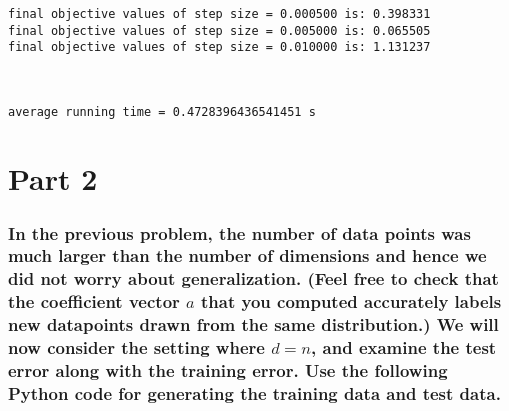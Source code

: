 \documentclass[11pt]{article}
\begin{document}
    \begin{Verbatim}[commandchars=\\\{\}]
final objective values of step size = 0.000500 is: 0.398331
final objective values of step size = 0.005000 is: 0.065505
final objective values of step size = 0.010000 is: 1.131237

    \end{Verbatim}

    \begin{center}
    \end{center}
    { \hspace*{\fill} \\}
    
    \begin{Verbatim}[commandchars=\\\{\}]
average running time = 0.4728396436541451 s

    \end{Verbatim}

    \section{Part 2}\label{part-2}

\subsubsection{\texorpdfstring{In the previous problem, the number of
data points was much larger than the number of dimensions and hence we
did not worry about generalization. (Feel free to check that the
coefficient vector \(a\) that you computed accurately labels new
datapoints drawn from the same distribution.) We will now consider the
setting where \(d = n\), and examine the test error along with the
training error. Use the following Python code for generating the
training data and test
data.}{In the previous problem, the number of data points was much larger than the number of dimensions and hence we did not worry about generalization. (Feel free to check that the coefficient vector a that you computed accurately labels new datapoints drawn from the same distribution.) We will now consider the setting where d = n, and examine the test error along with the training error. Use the following Python code for generating the training data and test data.}}\label{in-the-previous-problem-the-number-of-data-points-was-much-larger-than-the-number-of-dimensions-and-hence-we-did-not-worry-about-generalization.-feel-free-to-check-that-the-coefficient-vector-a-that-you-computed-accurately-labels-new-datapoints-drawn-from-the-same-distribution.-we-will-now-consider-the-setting-where-d-n-and-examine-the-test-error-along-with-the-training-error.-use-the-following-python-code-for-generating-the-training-data-and-test-data.}
\end{document}
